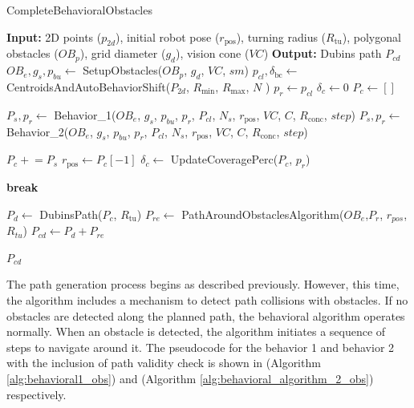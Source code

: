 \begin{algorithm}[H]
    \caption{CompleteBehavioralObstacles}
    \label{alg:complete_behavioral_obstacle_avoidance}
    \begin{algorithmic}[1]
    \Statex \textbf{Input:} 2D points ($p_{2d}$), initial robot pose ($r_{\text{pos}}$), turning radius ($R_{\text{tu}}$), polygonal obstacles ($OB_p$), grid diameter ($g_d$), vision cone ($VC$) 
    \Statex \textbf{Output:} Dubins path $P_{cd}$
    \newline
    \State $OB_e, g_s, p_{bu} \leftarrow$ SetupObstacles($OB_p$, $g_d$, $VC$, $sm$)
    \State $p_{cl}, \delta_{\text{bc}} \leftarrow$ CentroidsAndAutoBehaviorShift($P_{2d}$, $R_{\text{min}}$, $R_{\text{max}}$, $N$ )
    \State $p_r \leftarrow p_{cl}$
    \State $\delta_c \leftarrow 0$
    \State $P_c \leftarrow []$
    
            \State $P_s, p_r \leftarrow$ Behavior\_1($OB_e$, $g_s$, $p_{bu}$, $p_r$, $P_{cl}$, $N_s$, $r_{\text{pos}}$, $VC$, $C$, $R_{\text{conc}}$, $step$)
        \Else
            \State $P_s, p_r \leftarrow$ Behavior\_2($OB_e$, $g_s$, $p_{bu}$, $p_r$, $P_{cl}$, $N_s$, $r_{\text{pos}}$, $VC$, $C$, $R_{\text{conc}}$, $step$)
        \EndIf
        
        \State $P_c \mathrel{+}= P_s$
        \State $r_{\text{pos}} \leftarrow P_c[-1]$
        \State $\delta_c \leftarrow$ UpdateCoveragePerc($P_c$, $p_r$)
        
            \State \textbf{break}
        \EndIf
    \EndWhile
    
    \State $P_d \leftarrow$ DubinsPath($P_c$, $R_{\text{tu}}$)
    \State $P_{re} \leftarrow$ PathAroundObstaclesAlgorithm($OB_e$,$P_r$, $r_{pos}$, $R_{tu}$)
    \State $P_{cd} \leftarrow P_d + P_{re}$

    \State \Return $P_{cd}$
    \end{algorithmic}
\end{algorithm}


The path generation process begins as described previously. However, this time, the algorithm includes a mechanism to detect path collisions with obstacles. If no obstacles are detected along the planned path, the behavioral algorithm operates normally. When an obstacle is detected, the algorithm initiates a sequence of steps to navigate around it. The pseudocode for the behavior 1 and behavior 2 with the inclusion of path validity check is shown in (Algorithm \autoref{alg:behavioral1_obs}) and (Algorithm \autoref{alg:behavioral_algorithm_2_obs}) respectively.

